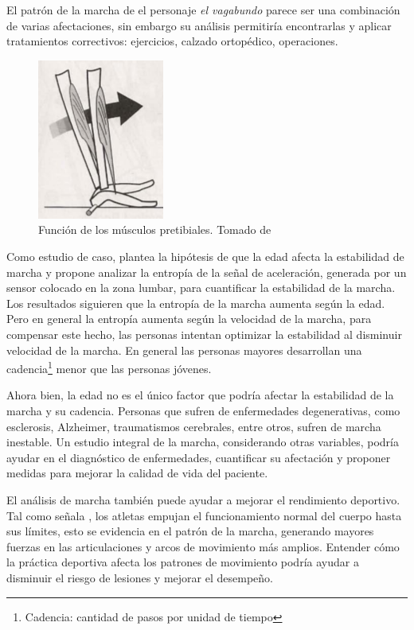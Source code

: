 El patrón de la marcha de el personaje \emph{el vagabundo} parece ser una combinación de varias afectaciones, sin embargo su análisis permitiría encontrarlas y aplicar tratamientos correctivos: ejercicios, calzado ortopédico, operaciones. 

\begin{figure}
    \centering
    \includegraphics[width=0.2\textheight]{imagenes/heel_rocker}
    \caption{Función de los músculos pretibiales. Tomado de \citep{perry}}
    \label{fig:heel_rocker}
\end{figure}

Como estudio de caso, \cite{arif} plantea la hipótesis de que la edad afecta la estabilidad de marcha y propone analizar la entropía de la señal de aceleración, generada por un sensor colocado en la zona lumbar, para cuantificar la estabilidad de la marcha. Los resultados siguieren que la entropía de la marcha aumenta según la edad. Pero en general la entropía aumenta según la velocidad de la marcha, para compensar este hecho, las personas intentan optimizar la estabilidad al disminuir velocidad de la marcha. En general las personas mayores desarrollan una cadencia\footnote{Cadencia: cantidad de pasos por unidad de tiempo} menor que las personas jóvenes. 

Ahora bien, la edad no es el único factor que podría afectar la estabilidad de la marcha y su cadencia. Personas que sufren de enfermedades degenerativas, como esclerosis, Alzheimer, traumatismos cerebrales, entre otros, sufren de marcha inestable. Un estudio integral de la marcha, considerando otras variables, podría ayudar en el diagnóstico de enfermedades, cuantificar su afectación y proponer medidas para mejorar la calidad de vida del paciente. 

El análisis de marcha también puede ayudar a mejorar el rendimiento deportivo. Tal como señala \cite{perry}, los atletas empujan el funcionamiento normal del cuerpo hasta sus límites, esto se evidencia en el patrón de la marcha, generando mayores fuerzas en las articulaciones y arcos de movimiento más amplios. Entender cómo la práctica deportiva afecta los patrones de movimiento podría ayudar a disminuir el riesgo de lesiones y mejorar el desempeño.  






